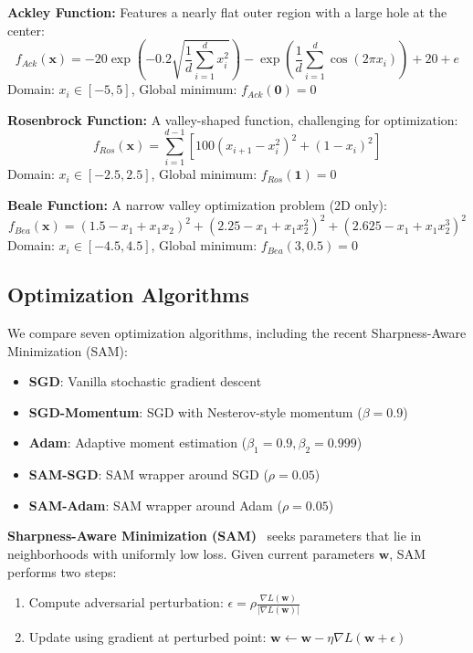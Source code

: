 \documentclass[12pt,a4paper]{article}
\begin{document}
\textbf{Ackley Function:} Features a nearly flat outer region with a large hole at the center:
\begin{equation}
f_{Ack}(\mathbf{x}) = -20\exp\left(-0.2\sqrt{\frac{1}{d}\sum_{i=1}^{d}x_i^2}\right) - \exp\left(\frac{1}{d}\sum_{i=1}^{d}\cos(2\pi x_i)\right) + 20 + e
\end{equation}
Domain: $x_i \in [-5, 5]$, Global minimum: $f_{Ack}(\mathbf{0}) = 0$

\textbf{Rosenbrock Function:} A valley-shaped function, challenging for optimization:
\begin{equation}
f_{Ros}(\mathbf{x}) = \sum_{i=1}^{d-1}\left[100(x_{i+1} - x_i^2)^2 + (1-x_i)^2\right]
\end{equation}
Domain: $x_i \in [-2.5, 2.5]$, Global minimum: $f_{Ros}(\mathbf{1}) = 0$

\textbf{Beale Function:} A narrow valley optimization problem (2D only):
\begin{equation}
f_{Bea}(\mathbf{x}) = (1.5 - x_1 + x_1x_2)^2 + (2.25 - x_1 + x_1x_2^2)^2 + (2.625 - x_1 + x_1x_2^3)^2
\end{equation}
Domain: $x_i \in [-4.5, 4.5]$, Global minimum: $f_{Bea}(3, 0.5) = 0$

\subsection{Optimization Algorithms}

We compare seven optimization algorithms, including the recent Sharpness-Aware Minimization (SAM):

\begin{itemize}
    \item \textbf{SGD}: Vanilla stochastic gradient descent
    \item \textbf{SGD-Momentum}: SGD with Nesterov-style momentum ($\beta=0.9$)
    \item \textbf{Adam}: Adaptive moment estimation ($\beta_1=0.9, \beta_2=0.999$)
    \item \textbf{SAM-SGD}: SAM wrapper around SGD ($\rho=0.05$)
    \item \textbf{SAM-Adam}: SAM wrapper around Adam ($\rho=0.05$)
\end{itemize}

\textbf{Sharpness-Aware Minimization (SAM)}~\cite{foret2020sharpness} seeks parameters that lie in neighborhoods with uniformly low loss. Given current parameters $\mathbf{w}$, SAM performs two steps:

\begin{enumerate}
    \item Compute adversarial perturbation: $\epsilon = \rho \frac{\nabla L(\mathbf{w})}{|\nabla L(\mathbf{w})|}$
    \item Update using gradient at perturbed point: $\mathbf{w} \leftarrow \mathbf{w} - \eta \nabla L(\mathbf{w} + \epsilon)$
\end{enumerate}
\end{document}
